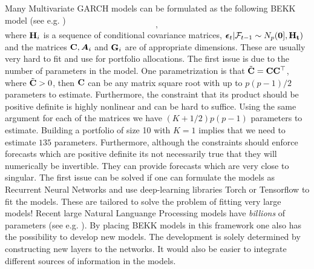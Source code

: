 \documentclass[oneside]{book}\usepackage{knitr}
\begin{document}
Many Multivariate GARCH models can be formulated as the following BEKK model (see e.g. \citet{engle1995multivariate})
\begin{equation}\label{eqn:BEKK}
  ,
\end{equation}
where $\mathbf{H}_i$ is a sequence of conditional covariance matrices, $\boldsymbol{\epsilon}_t | \mathcal{F}_{t-1} \sim N_p(\mathbf{0], \mathbf{H}_t})$ and the matrices $\mathbf{C}, \mbox{\boldmath$A$}_i$ and $\mathbf{G}_i$ are of appropriate dimensions.
These are usually very hard to fit and use for portfolio allocations. 
The first issue is due to the number of parameters in the model.
One parametrization is that $\tilde {\mathbf{C}} = \mathbf{C}\mathbf{C}^\top$, where $\tilde {\mathbf{C}} > 0$, then $\mathbf{C}$ can be any matrix square root with up to $p(p-1)/2$ parameters to estimate. 
Furthermore, the constraint that its product should be positive definite is highly nonlinear and can be hard to suffice.
Using the same argument for each of the matrices we have $(K+1/2)p(p-1)$ parameters to estimate. 
Building a portfolio of size 10 with $K=1$ implies that we need to estimate $135$ parameters.
Furthermore, although the constraints should enforce forecasts which are positive definite its not necessarily true that they will numerically be invertible.
They can provide forecasts which are very close to singular.
The first issue can be solved if one can formulate the models as Recurrent Neural Networks and use deep-learning libraries Torch or Tensorflow to fit the models. 
These are tailored to solve the problem of fitting very large models! 
Recent large Natural Languange Processing models have \textit{billions} of parameters (see e.g. \citet{brown2020language}). 
By placing BEKK models in this framework one also has the possibility to develop new models. 
The development is solely determined by constructing new layers to the networks. 
It would also be easier to integrate different sources of information in the models.

%

\printbibliography

\end{document}
